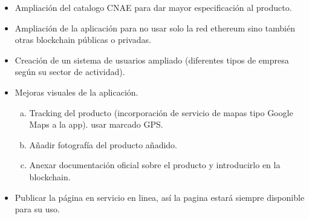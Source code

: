 \begin{itemize}
	\item Ampliación del catalogo CNAE para dar mayor especificación al producto.
	\item Ampliación de la aplicación para no usar solo la red ethereum sino también otras blockchain públicas o privadas.
	\item Creación de un sistema de usuarios ampliado (diferentes tipos de empresa según su sector de actividad).
	\item Mejoras visuales de la aplicación.
	\begin{enumerate}[a)]
		\item Tracking del producto (incorporación de servicio de mapas tipo Google Maps a la app). usar marcado GPS.
		\item Añadir fotografía del producto añadido.
		\item Anexar documentación oficial sobre el producto y introducirlo en la blockchain.
	\end{enumerate}
	\item Publicar la página en servicio en linea, así la pagina estará siempre disponible para su uso.
\end{itemize}


